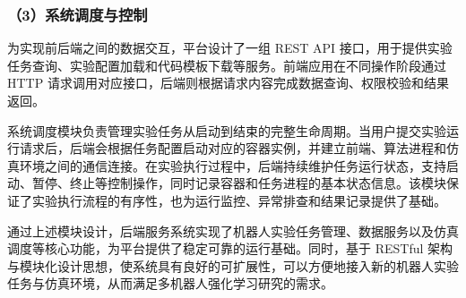 \subsubsection{（3）系统调度与控制}
为实现前后端之间的数据交互，平台设计了一组 REST API 接口，用于提供实验任务查询、实验配置加载和代码模板下载等服务。前端应用在不同操作阶段通过 HTTP 请求调用对应接口，后端则根据请求内容完成数据查询、权限校验和结果返回。

系统调度模块负责管理实验任务从启动到结束的完整生命周期。当用户提交实验运行请求后，后端会根据任务配置启动对应的容器实例，并建立前端、算法进程和仿真环境之间的通信连接。在实验执行过程中，后端持续维护任务运行状态，支持启动、暂停、终止等控制操作，同时记录容器和任务进程的基本状态信息。该模块保证了实验执行流程的有序性，也为运行监控、异常排查和结果记录提供了基础。

通过上述模块设计，后端服务系统实现了机器人实验任务管理、数据服务以及仿真调度等核心功能，为平台提供了稳定可靠的运行基础。同时，基于 RESTful 架构与模块化设计思想，使系统具有良好的可扩展性，可以方便地接入新的机器人实验任务与仿真环境，从而满足多机器人强化学习研究的需求。





